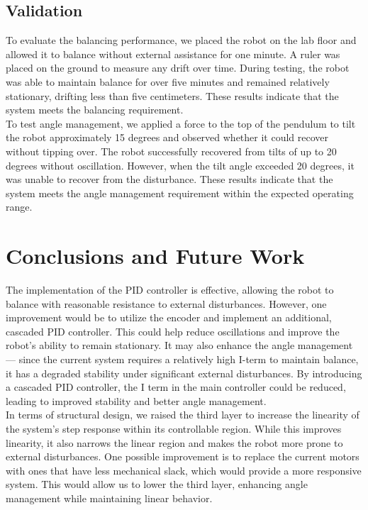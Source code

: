 \documentclass{article}
\begin{document}
\subsection{Validation}
To evaluate the balancing performance, we placed the robot on the lab floor and
allowed it to balance without external assistance for one minute. A ruler was
placed on the ground to measure any drift over time. During testing, the robot
was able to maintain balance for over five minutes and remained relatively
stationary, drifting less than five centimeters. These results indicate that the
system meets the balancing requirement.\\

To test angle management, we applied a force to the top of the pendulum to tilt
the robot approximately 15 degrees and observed whether it could recover without
tipping over. The robot successfully recovered from tilts of up to 20 degrees
without oscillation. However, when the tilt angle exceeded 20 degrees, it was
unable to recover from the disturbance. These results indicate that the system
meets the angle management requirement within the expected operating range.\\

\section{Conclusions and Future Work}
The implementation of the PID controller is effective, allowing the robot to
balance with reasonable resistance to external disturbances. However, one
improvement would be to utilize the encoder and implement an additional,
cascaded PID controller. This could help reduce oscillations and improve the
robot's ability to remain stationary. It may also enhance the angle
management — since the current system requires a relatively high I-term to
maintain balance, it has a degraded stability under significant external
disturbances. By introducing a cascaded PID controller, the I term in the main
controller could be reduced, leading to improved stability and better angle
management.\\

In terms of structural design, we raised the third layer to increase the
linearity of the system's step response within its controllable region. While
this improves linearity, it also narrows the linear region and makes the robot
more prone to external disturbances. One possible improvement is to replace the
current motors with ones that have less mechanical slack, which would provide a
more responsive system. This would allow us to lower the third layer, enhancing
angle management while maintaining linear behavior.\\
\end{document}
